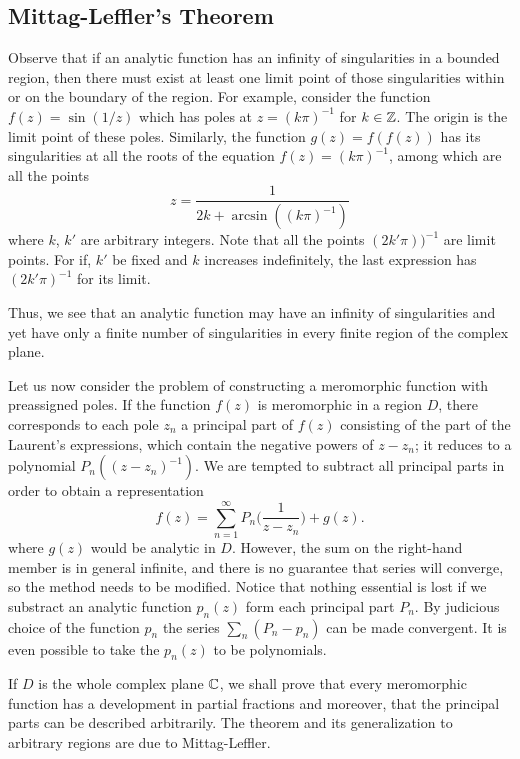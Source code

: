 \subsection{Mittag-Leffler's Theorem}
Observe that if an analytic function has an infinity of singularities in a bounded region, then there must exist at least one limit point of those singularities within or on the boundary of the region. For example, consider the function $f(z)=\sin(1/z)$ which has poles at $z=(k\pi)^{-1}$ for $k\in\mathbb{Z}$. The origin is the limit point of these poles. Similarly, the function $g(z)=f(f(z))$ has its singularities at all the roots of the equation $f(z)=(k\pi)^{-1}$, among which are all the points
\[z=\frac{1}{2k+\arcsin((k\pi)^{-1})}\]
where $k$, $k'$ are arbitrary integers. Note that all the points $(2k'\pi))^{-1}$ are limit points. For if, $k'$ be fixed and $k$ increases indefinitely, the last expression has $(2k'\pi)^{-1}$ for its limit.\par
Thus, we see that an analytic function may have an infinity of singularities and yet have only a finite number of singularities in every finite region of the complex plane.\par
Let us now consider the problem of constructing a meromorphic function with preassigned poles. If the function $f(z)$ is meromorphic in a region $D$, there corresponds to each pole $z_n$ a principal part of $f(z)$ consisting of the part of the Laurent's expressions, which contain the negative powers of $z-z_n$; it reduces to a polynomial $P_n((z-z_n)^{-1})$. We are tempted to subtract all principal parts in order to obtain a representation
\[f(z)=\sum_{n=1}^{\infty}P_n\Big(\frac{1}{z-z_n}\Big)+g(z).\]
where $g(z)$ would be analytic in $D$. However, the sum on the right-hand member is in general infinite, and there is no guarantee that series will converge, so the method needs to be modified. Notice that nothing essential is lost if we substract an analytic function $p_n(z)$ form each principal part $P_n$. By judicious choice of the function $p_n$ the series $\sum_n(P_n-p_n)$ can be made convergent. It is even possible to take the $p_n(z)$ to be polynomials.\par
If $D$ is the whole complex plane $\mathbb{C}$, we shall prove that every meromorphic function has a development in partial fractions and moreover, that the principal parts can be described arbitrarily. The theorem and its generalization to arbitrary regions are due to Mittag-Leffler.
